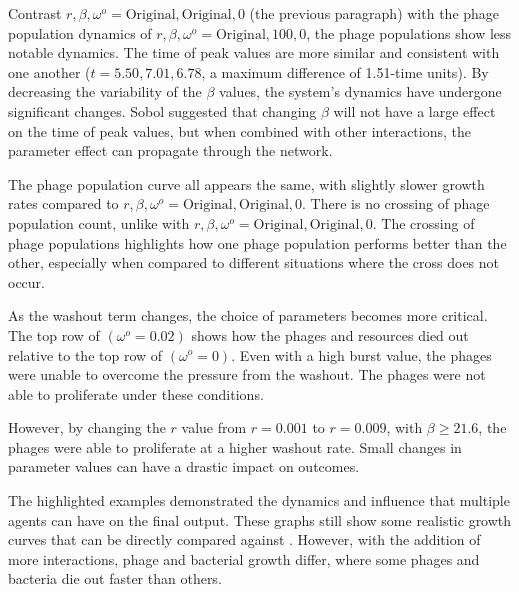 Contrast $r, \beta, \omega^o=\text{Original}, \text{Original}, 0$ (the previous paragraph) with the phage population dynamics of $r, \beta, \omega^o = \text{Original}, 100, 0$, the phage populations show less notable dynamics. 
The time of peak values are more similar and consistent with one another ($t=5.50, 7.01, 6.78$, a maximum difference of 1.51-time units). 
By decreasing the variability of the $\beta$ values, the system’s dynamics have undergone significant changes. 
Sobol suggested that changing $\beta$ will not have a large effect on the time of peak values, but when combined with other interactions, the parameter effect can propagate through the network. 

The phage population curve all appears the same, with slightly slower growth rates compared to $r, \beta, \omega^o=\text{Original}, \text{Original}, 0$. 
There is no crossing of phage population count, unlike with $r, \beta, \omega^o=\text{Original}, \text{Original}, 0$. 
The crossing of phage populations highlights how one phage population performs better than the other, especially when compared to different situations where the cross does not occur. 

As the washout term changes, the choice of parameters becomes more critical. 
The top row of  $(\omega^o = 0.02)$ shows how the phages and resources died out relative to the top row of  $(\omega^o = 0)$. 
Even with a high burst value, the phages were unable to overcome the pressure from the washout. 
The phages were not able to proliferate under these conditions. 

However, by changing the $r$ value from $r=0.001$ to $r=0.009$, with $\beta \geq 21.6$, the phages were able to proliferate at a higher washout rate. 
Small changes in parameter values can have a drastic impact on outcomes.

The highlighted examples demonstrated the dynamics and influence that multiple agents can have on the final output. 
These graphs still show some realistic growth curves that can be directly compared against . 
However, with the addition of more interactions, phage and bacterial growth differ, where some phages and bacteria die out faster than others. 

